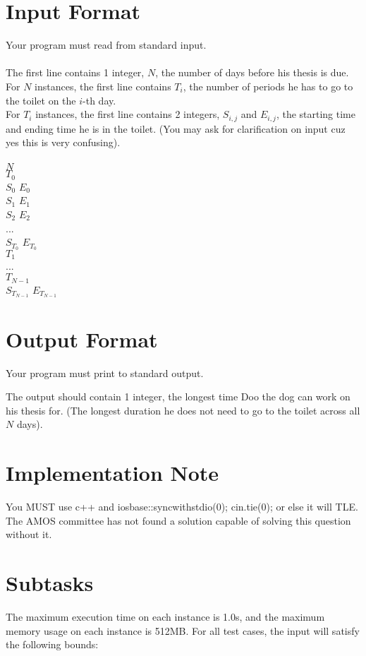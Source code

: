 \documentclass{report}
\begin{document}
\section*{Input Format}
Your program must read from standard input.
\\\\
The first line contains 1 integer, $N$, the number of days before his thesis is due.
\\
For $N$ instances, the first line contains $T_i$, the number of periods he has to go to the toilet on the $i$-th day.
\\
For $T_i$ instances, the first line contains 2 integers, $S_{i,j}$ and $E_{i,j}$, the starting time and ending time he is in the toilet. (You may ask for clarification on input cuz yes this is very confusing).
\\\\
$N$
\\
$T_0$
\\
$S_0$ $E_0$
\\
$S_1$ $E_1$
\\
$S_2$ $E_2$
\\
...
\\
$S_{T_0}$ $E_{T_0}$
\\
$T_1$
\\
...
\\
$T_{N-1}$
\\
$S_{T_{N-1}}$ $E_{T_{N-1}}$

\section*{Output Format}
Your program must print to standard output.

\pagebreak
\hfill \break \hfill \break \hfill \break

The output should contain 1 integer, the longest time Doo the dog can work on his thesis for. (The longest duration he does not need to go to the toilet across all $N$ days).

\section*{Implementation Note}
You MUST use c++ and ios\textunderscore base::sync\textunderscore with\textunderscore stdio(0); cin.tie(0); or else it will TLE. The AMOS committee has not found a solution capable of solving this question without it. 

\section*{Subtasks}
The maximum execution time on each instance is 1.0s, and the maximum memory usage on each instance is 512MB. For all test cases, the input will satisfy the following bounds:
\end{document}
